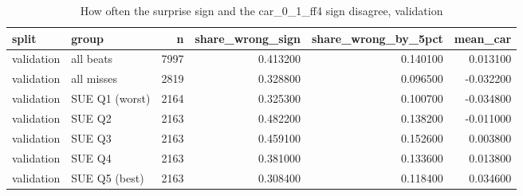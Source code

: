 \begin{table}
\caption{How often the surprise sign and the car_0_1_ff4 sign disagree, validation}
\label{tab:cd_surprise_errors__validation}
\begin{tabular}{llrrrr}
\toprule
split & group & n & share\_wrong\_sign & share\_wrong\_by\_5pct & mean\_car \\
\midrule
validation & all beats & 7997 & 0.413200 & 0.140100 & 0.013100 \\
validation & all misses & 2819 & 0.328800 & 0.096500 & -0.032200 \\
validation & SUE Q1 (worst) & 2164 & 0.325300 & 0.100700 & -0.034800 \\
validation & SUE Q2 & 2163 & 0.482200 & 0.138200 & -0.011000 \\
validation & SUE Q3 & 2163 & 0.459100 & 0.152600 & 0.003800 \\
validation & SUE Q4 & 2163 & 0.381000 & 0.133600 & 0.013800 \\
validation & SUE Q5 (best) & 2163 & 0.308400 & 0.118400 & 0.034600 \\
\bottomrule
\end{tabular}
\end{table}
